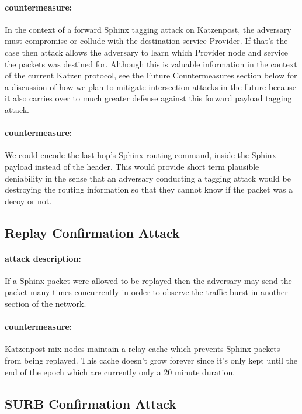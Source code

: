 \documentclass{article}
\begin{document}
\paragraph{countermeasure:} In the context of a forward Sphinx tagging attack on Katzenpost,
the adversary must compromise or collude with the destination service Provider. If that's
the case then attack allows the adversary to learn which Provider node and service the packets was destined for. Although this is valuable information in the context of the current Katzen protocol, see the Future Countermeasures section below for a discussion of how we plan to mitigate intersection attacks in the future because it also carries over to much greater defense
against this forward payload tagging attack.

\paragraph{countermeasure:} We could encode the last hop's Sphinx routing command, inside the Sphinx payload instead of the header.
This would provide short term plausible deniability in the sense that an adversary conducting a tagging attack would be destroying
the routing information so that they cannot know if the packet was a decoy or not.



\subsection{Replay Confirmation Attack}

\paragraph{attack description:}
If a Sphinx packet were allowed to be replayed then the adversary may send the packet
many times concurrently in order to observe the traffic burst in another section of the
network.

\paragraph{countermeasure:} Katzenpost mix nodes maintain a relay cache which prevents Sphinx
packets from being replayed. This cache doesn't grow forever since it's only kept until the
end of the epoch which are currently only a 20 minute duration.

\subsection{SURB Confirmation Attack}
\end{document}
